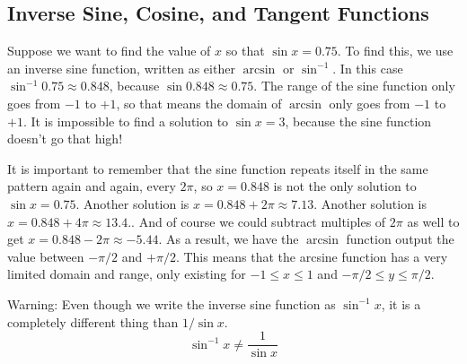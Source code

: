 \subsection*{Inverse Sine, Cosine, and Tangent Functions}

Suppose we want to find the value of $x$ so that $\sin x = 0.75$.  To find this, we use an
inverse sine function, written as either $\arcsin$ or $\sin^{-1}$.  In this case
$\sin^{-1} 0.75 \approx 0.848$, because $\sin 0.848 \approx 0.75$.  The range of the sine
function only goes from $-1$ to $+1$, so that means the domain of $\arcsin$ only goes from
$-1$ to $+1$.  It is impossible to find a solution to $\sin x = 3$, because the sine
function doesn't go that high!

It is important to remember that the sine function repeats itself in the same pattern
again and again, every $2\pi$, so $x = 0.848$ is not the only solution to $\sin x = 0.75$.
Another solution is $x = 0.848 + 2 \pi \approx 7.13$.  Another solution is $x = 0.848 + 4
\pi \approx 13.4.$.  And of course we could subtract multiples of $2 \pi$ as well to get
$x = 0.848 - 2 \pi \approx -5.44$.  As a result, we have the $\arcsin$ function output the
value between $-\pi/2$ and $+\pi/2$.  This means that the arcsine function has a very
limited domain and range, only existing for $ -1 \leq x \leq 1$ and $-\pi/2 \leq y \leq
\pi/2$.

Warning:  Even though we write the inverse sine function as $\sin^{-1} x$, it is a completely different thing than $1 / \sin x$.
\[ \sin^{-1}x \neq \frac{1}{\sin x} \]

